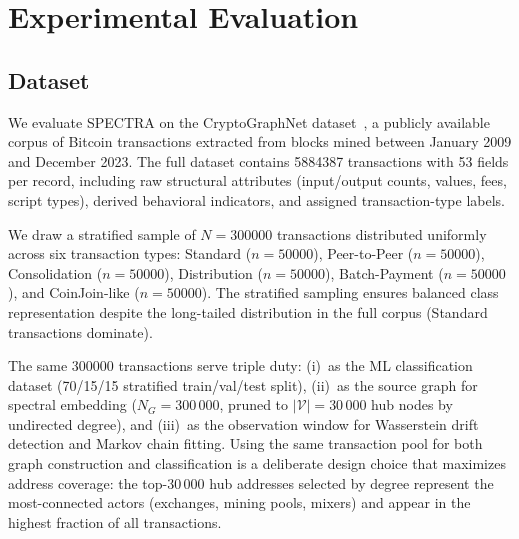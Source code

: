 
\section{Experimental Evaluation}
\label{sec:experiments}


\subsection{Dataset}
\label{subsec:dataset}

We evaluate SPECTRA on the CryptoGraphNet dataset~\cite{cryptographnet2024},
a publicly available corpus of Bitcoin transactions extracted from blocks
mined between January 2009 and December 2023.
The full dataset contains \num{5884387} transactions with \num{53} fields per
record, including raw structural attributes (input/output counts, values, fees,
script types), derived behavioral indicators, and assigned transaction-type labels.

We draw a stratified sample of $N = \num{300000}$ transactions distributed
uniformly across six transaction types:
Standard ($n = \num{50000}$),
Peer-to-Peer ($n = \num{50000}$),
Consolidation ($n = \num{50000}$),
Distribution ($n = \num{50000}$),
Batch-Payment ($n = \num{50000}$), and
CoinJoin-like ($n = \num{50000}$).
The stratified sampling ensures balanced class representation despite the
long-tailed distribution in the full corpus (Standard transactions dominate).

The same \num{300000} transactions serve triple duty:
(i)~as the ML classification dataset (70/15/15 stratified train/val/test split),
(ii)~as the source graph for spectral embedding ($N_G = 300\,000$,
pruned to $|\mathcal{V}| = 30\,000$ hub nodes by undirected degree), and
(iii)~as the observation window for Wasserstein drift detection and
Markov chain fitting.
Using the same transaction pool for both graph construction and classification
is a deliberate design choice that maximizes address coverage: the top-30\,000
hub addresses selected by degree represent the most-connected actors
(exchanges, mining pools, mixers) and appear in the highest fraction of
all transactions.

